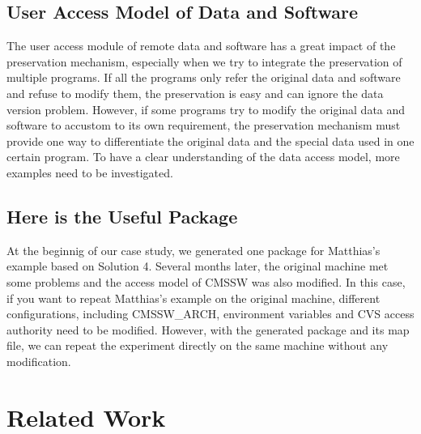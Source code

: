 \documentclass{acm_proc_article-sp}
\begin{document}
\subsection{User Access Model of Data and Software}

The user access module of remote data
and software has a great impact of the preservation mechanism, especially when
we try to integrate the preservation of multiple programs. If all the programs
only refer the original data and software and refuse to modify them, the
preservation is easy and can ignore the data version problem. However, if some
programs try to modify the original data and software to accustom to its own
requirement, the preservation mechanism must provide one way to differentiate
the original data and the special data used in one certain
program. To have a clear understanding of the data access model, more examples
need to be investigated.

\subsection{Here is the Useful Package}

At the beginnig of our case study, we generated one package for Matthias's
example based on Solution 4. Several months later, the original machine met
some problems and the access model of CMSSW was also modified. In this case, if
you want to repeat Matthias's example on the original machine, different 
configurations, including CMSSW\_ARCH, environment variables and CVS access
authority need to be modified. However, with the generated package and its map file, we can repeat the experiment directly on the same machine without any modification.

\section{Related Work }
\end{document}
